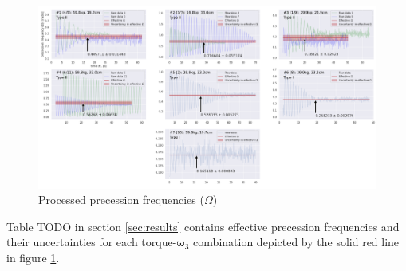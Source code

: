 \begin{figure}[!ht]
  \centering
  \includegraphics[width=\textwidth]{gyroscope/images/processed_precession}
  \caption{Processed precession frequencies ($\Omega$) }  
  \label{fig:results:processed_precession}
\end{figure}

Table TODO in section \ref{sec:results} contains effective precession frequencies and their uncertainties for each torque-$\boldsymbol\omega_{3}$ combination depicted by the solid red line in figure \ref{fig:results:processed_precession}.
